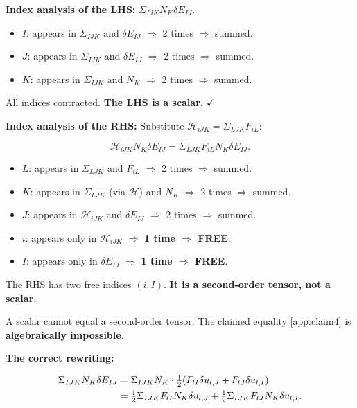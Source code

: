 \documentclass[11pt]{article}
\begin{document}
\textbf{Index analysis of the LHS:} $\Sigma_{IJK}N_K\delta E_{IJ}$.

\begin{itemize}
\item $I$: appears in $\Sigma_{IJK}$ and $\delta E_{IJ}$ $\Rightarrow$ 2 times $\Rightarrow$ summed.
\item $J$: appears in $\Sigma_{IJK}$ and $\delta E_{IJ}$ $\Rightarrow$ 2 times $\Rightarrow$ summed.
\item $K$: appears in $\Sigma_{IJK}$ and $N_K$ $\Rightarrow$ 2 times $\Rightarrow$ summed.
\end{itemize}

All indices contracted. \textbf{The LHS is a scalar.} $\checkmark$

\textbf{Index analysis of the RHS:} Substitute $\mathcal{H}_{iJK}=\Sigma_{LJK}F_{iL}$:

\begin{equation}
\mathcal{H}_{iJK}N_K\delta E_{IJ} = \Sigma_{LJK}F_{iL}N_K\delta E_{IJ}.
\end{equation}

\begin{itemize}
\item $L$: appears in $\Sigma_{LJK}$ and $F_{iL}$ $\Rightarrow$ 2 times $\Rightarrow$ summed.
\item $K$: appears in $\Sigma_{LJK}$ (via $\mathcal{H}$) and $N_K$ $\Rightarrow$ 2 times $\Rightarrow$ summed.
\item $J$: appears in $\mathcal{H}_{iJK}$ and $\delta E_{IJ}$ $\Rightarrow$ 2 times $\Rightarrow$ summed.
\item $i$: appears only in $\mathcal{H}_{iJK}$ $\Rightarrow$ \textbf{1 time $\Rightarrow$ FREE}.
\item $I$: appears only in $\delta E_{IJ}$ $\Rightarrow$ \textbf{1 time $\Rightarrow$ FREE}.
\end{itemize}

The RHS has two free indices $(i,I)$. \textbf{It is a second-order tensor, not a scalar.}

A scalar cannot equal a second-order tensor. The claimed equality \eqref{app:claim4} is \textbf{algebraically impossible}.

\textbf{The correct rewriting:}

\begin{align}
\Sigma_{IJK}N_K\delta E_{IJ}
&= \Sigma_{IJK}N_K\cdot\tfrac{1}{2}(F_{lI}\delta u_{l,J}+F_{lJ}\delta u_{l,I}) \notag\\
&= \tfrac{1}{2}\Sigma_{IJK}F_{lI}N_K\delta u_{l,J}
   + \tfrac{1}{2}\Sigma_{IJK}F_{lJ}N_K\delta u_{l,I}.
\end{align}
\end{document}
